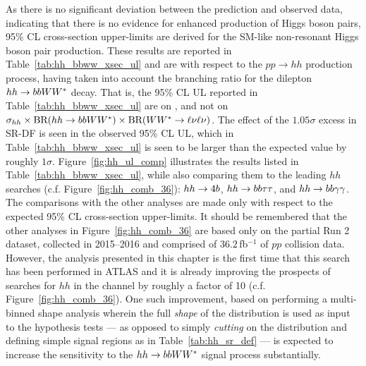 As there is no significant deviation between the prediction and observed data,
indicating that there is no evidence for enhanced production of Higgs boson pairs, 95\% CL
cross-section upper-limits are derived for the SM-like non-resonant Higgs boson pair
production.
These results are reported in Table~\ref{tab:hh_bbww_xsec_ul} and are with respect to the
$pp \rightarrow hh$ production process, having taken into account the branching ratio for the dilepton $hh \rightarrow bbWW^*$
decay.
That is, the 95\% CL UL reported in Table~\ref{tab:hh_bbww_xsec_ul} are on \sigmaHH, and not
on $\sigma_{hh} \times \text{BR}(hh \rightarrow bbWW^*) \times \text{BR}(WW^* \rightarrow \ell \nu \ell \nu)$.
The effect of the $1.05\sigma$ excess in SR-DF is seen in the observed 95\% CL UL, which in Table~\ref{tab:hh_bbww_xsec_ul}
is seen to be larger than the expected value by roughly $1\sigma$.
Figure~\ref{fig:hh_ul_comp} illustrates the results listed in Table~\ref{tab:hh_bbww_xsec_ul},
while also comparing them to the leading $hh$ searches (c.f. Figure~\ref{fig:hh_comb_36}): $hh \rightarrow 4b$,
$hh \rightarrow bb\tau\tau$, and $hh \rightarrow bb\gamma\gamma$.
The comparisons with the other analyses are made only with respect to the expected 95\% CL cross-section upper-limits.
It should be remembered that the other analyses in Figure~\ref{fig:hh_comb_36} are based only on the partial Run 2
dataset, collected in 2015--2016 and comprised of $36.2$\,fb$^{-1}$ of $pp$ collision data.
However, the analysis presented in this chapter is the first time that this search has been performed
in ATLAS and it is already improving the prospects of searches for $hh$ in the \bbww channel by roughly
a factor of 10 (c.f. Figure~\ref{fig:hh_comb_36}).
One such improvement, based on performing a multi-binned shape analysis wherein the full \textit{shape} of the \dhh
distribution is used as input to the hypothesis tests --- as opposed to simply \textit{cutting} on the \dhh distribution
and defining simple signal regions as in Table~\ref{tab:hh_sr_def} --- is expected to increase the sensitivity to the $hh \rightarrow bbWW^*$ signal process
substantially.

